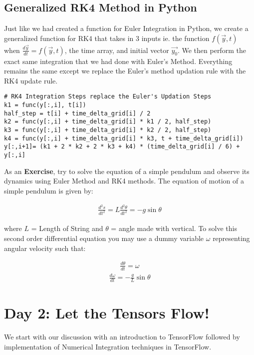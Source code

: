 \documentclass[10pt,letterpaper]{article}
\begin{document}
\subsection*{Generalized RK4 Method in Python}

Just like we had created a function for Euler Integration in Python, we create a generalized function for RK4 that takes in 3 inputs ie. the function $f(\vec{y},t)$ when $\frac{d\vec{y}}{dt}=f(\vec{y},t)$, the time array, and initial vector $\vec{y_0}$. We then perform the exact same integration that we had done with Euler's Method. Everything remains the same except we replace the Euler's method updation rule with the RK4 update rule.

\begin{verbatim}
# RK4 Integration Steps replace the Euler's Updation Steps
k1 = func(y[:,i], t[i])                               
half_step = t[i] + time_delta_grid[i] / 2
k2 = func(y[:,i] + time_delta_grid[i] * k1 / 2, half_step)
k3 = func(y[:,i] + time_delta_grid[i] * k2 / 2, half_step)
k4 = func(y[:,i] + time_delta_grid[i] * k3, t + time_delta_grid[i])
y[:,i+1]= (k1 + 2 * k2 + 2 * k3 + k4) * (time_delta_grid[i] / 6) + y[:,i]
\end{verbatim}

As an \textbf{Exercise}, try to solve the equation of a simple pendulum and observe its dynamics using Euler Method and RK4 methods. The equation of motion of a simple pendulum is given by: 

\begin{eqnarray}\frac{d^2s}{dt^2}=L\frac{d^2\theta}{dt^2}=-g\sin{\theta}\end{eqnarray}

where $L$ = Length of String and $\theta$ = angle made with vertical. To solve this second order differential equation you may use a dummy variable $\omega$ representing angular velocity such that:

\begin{eqnarray}\frac{d\theta}{dt}=\omega \end{eqnarray}
\begin{eqnarray}\frac{d\omega}{dt}=-\frac{g}{L}\sin{\theta} \end{eqnarray}

\section*{Day 2: Let the Tensors Flow!}

We start with our discussion with an introduction to TensorFlow followed by implementation of Numerical Integration techniques in TensorFlow.
\end{document}
